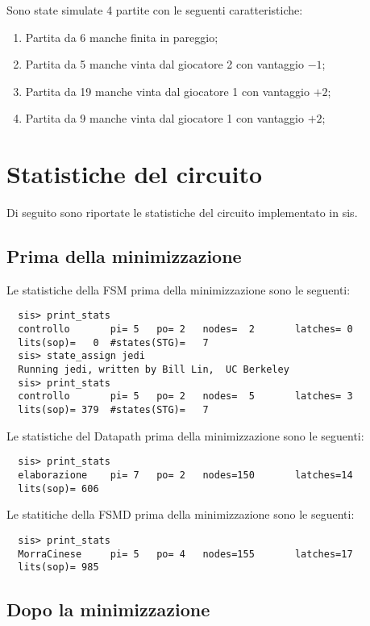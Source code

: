 \documentclass[a4paper]{article}
\begin{document}
\noindent Sono state simulate 4 partite con le seguenti caratteristiche:
\begin{enumerate}
	\item Partita da 6 manche finita in pareggio;
	\item Partita da 5 manche vinta dal giocatore 2 con vantaggio \( -1 \);
	\item Partita da 19 manche vinta dal giocatore 1 con vantaggio \( +2 \);
	\item Partita da 9 manche vinta dal giocatore 1 con vantaggio \( +2 \);
\end{enumerate}

\section{Statistiche del circuito}
Di seguito sono riportate le statistiche del circuito implementato in sis.

\subsection{Prima della minimizzazione}
Le statistiche della FSM prima della minimizzazione sono le seguenti:
\begin{lstlisting}
  sis> print_stats
  controllo       pi= 5   po= 2   nodes=  2       latches= 0
  lits(sop)=   0  #states(STG)=   7
  sis> state_assign jedi
  Running jedi, written by Bill Lin,  UC Berkeley
  sis> print_stats
  controllo       pi= 5   po= 2   nodes=  5       latches= 3
  lits(sop)= 379  #states(STG)=   7
\end{lstlisting}

\noindent Le statistiche del Datapath prima della minimizzazione sono le seguenti:
\begin{lstlisting}
  sis> print_stats
  elaborazione    pi= 7   po= 2   nodes=150       latches=14
  lits(sop)= 606
\end{lstlisting}

\noindent Le statitiche della FSMD prima della minimizzazione sono le seguenti:
\begin{lstlisting}
  sis> print_stats
  MorraCinese     pi= 5   po= 4   nodes=155       latches=17
  lits(sop)= 985
\end{lstlisting}

\subsection{Dopo la minimizzazione}
\end{document}
